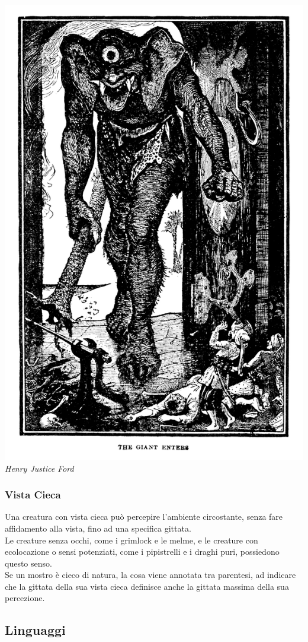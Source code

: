 \begin{multicols}{2}
\begin{center}
	\includegraphics[width=0.7\linewidth]{immagini/ciclope.png}\\
	\textit{Henry Justice Ford}
\end{center}


\subsubsection{Vista Cieca}

Una creatura con vista cieca può percepire l'ambiente circostante, senza fare affidamento alla vista, fino ad una specifica gittata. \\
Le creature senza occhi, come i grimlock e le melme, e le creature con ecolocazione o sensi potenziati, come i pipistrelli e i draghi puri, possiedono questo senso. \\
Se un mostro è cieco di natura, la cosa viene annotata tra parentesi, ad indicare che la gittata della sua vista cieca definisce anche la gittata massima della sua percezione.\\

\subsection{Linguaggi}


\end{multicols}
